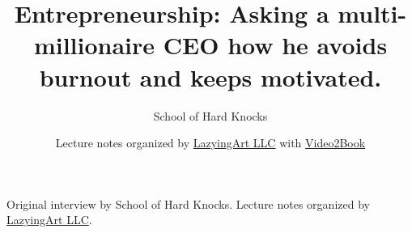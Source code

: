 \documentclass[11pt,oneside]{book}
\begin{document}
\frontmatter
\title{Entrepreneurship: Asking a multi-millionaire CEO how he avoids burnout and keeps motivated.}
\author{School of Hard Knocks}
\date{Lecture notes organized by \href{https://lazying.art}{LazyingArt LLC} with \href{https://github.com/lachlanchen/Video2Book}{Video2Book}}
\maketitle
\begin{center}
\small Original interview by School of Hard Knocks. Lecture notes organized by \href{https://lazying.art}{LazyingArt LLC}.
\end{center}
\clearpage
\mainmatter

\end{document}
